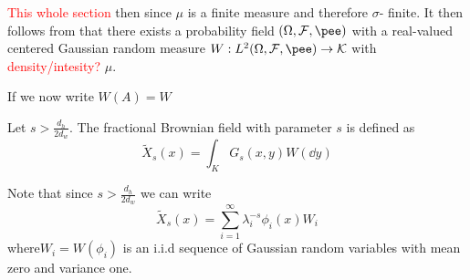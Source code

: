 \textcolor{red}{This whole section}
 then since $\mu$ is a finite measure and therefore $\sigma$- finite. It then follows from \cite[Prop. 1.13]{LeGall} that there exists a probability field $(\Omega, \mathcal{F}, \pee)$ with a real-valued centered Gaussian random measure $W:L^{2}(\Omega, \mathcal{F}, \pee) \to \mathcal{K}$ with \textcolor{red}{density/intesity?} $\mu$.

If we now write $W(A) = W$

\begin{defi}
	Let $s > \frac{d_h}{2d_w}$. The fractional Brownian field with parameter $s$ is defined as 
	\begin{equation}
		\widetilde{X}_s(x) = \int_{K} G_s(x,y)W(\dd y)
	\end{equation}
\end{defi}

Note that since $s > \frac{d_h}{2d_w}$ we can write
\begin{equation}
	\widetilde{X}_s(x) = \sum_{i = 1}^{\infty} \lambda_i^{-s}\phi_i(x)W_i
\end{equation}
where$W_i = W(\phi_i)$ is an i.i.d sequence of Gaussian random variables with mean zero and variance one.

